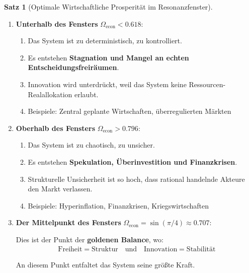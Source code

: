 \documentclass[a4paper,12pt,twoside]{report}
\theoremstyle{definition}
\newtheorem{satz}{Satz}
\begin{document}
\begin{satz}[Optimale Wirtschaftliche Prosperität im Resonanzfenster]
\begin{enumerate}
	\item \textbf{Unterhalb des Fensters} $\Omega_{\text{econ}} < 0.618$:
	
	\begin{enumerate}
		\item Das System ist zu deterministisch, zu kontrolliert.
		\item Es entstehen \textbf{Stagnation und Mangel an echten Entscheidungsfreiräumen}.
		\item Innovation wird unterdrückt, weil das System keine Ressourcen-Realallokation erlaubt.
		\item Beispiele: Zentral geplante Wirtschaften, überregulierten Märkten
	\end{enumerate}
	
	\item \textbf{Oberhalb des Fensters} $\Omega_{\text{econ}} > 0.796$:
	
	\begin{enumerate}
		\item Das System ist zu chaotisch, zu unsicher.
		\item Es entstehen \textbf{Spekulation, Überinvestition und Finanzkrisen}.
		\item Strukturelle Unsicherheit ist so hoch, dass rational handelnde Akteure den Markt verlassen.
		\item Beispiele: Hyperinflation, Finanzkrisen, Kriegswirtschaften
	\end{enumerate}
	
	\item \textbf{Der Mittelpunkt des Fensters} $\Omega_{\text{econ}} = \sin(\pi/4) \approx 0.707$:
	
	Dies ist der Punkt der \textbf{goldenen Balance}, wo:
	\begin{align}
	\text{Freiheit} = \text{Struktur} \quad \text{und} \quad \text{Innovation} = \text{Stabilität}
	\end{align}
	
	An diesem Punkt entfaltet das System seine größte Kraft.
\end{enumerate}

\end{satz}
\end{document}
